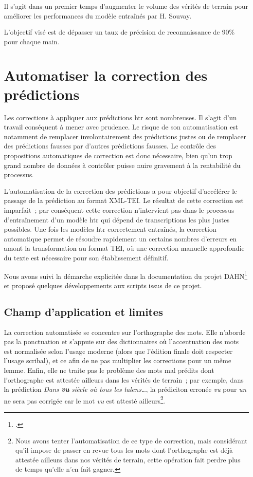\documentclass[a4paper,12pt,twoside]{book}
\begin{document}
			Il s'agit dans un premier temps d'augmenter le volume des vérités de terrain pour améliorer les performances du modèle entraînés par H. Souvay.
			
			L'objectif visé est de dépasser un taux de précision de reconnaissance de 90\% pour chaque main.
	
		\section{Automatiser la correction des prédictions}
			Les corrections à appliquer aux prédictions \gls{htr} sont nombreuses. Il s'agit d'un travail conséquent à mener avec prudence. Le risque de son automatisation est notamment de remplacer involontairement des prédictions justes ou de remplacer des prédictions fausses par d'autres prédictions fausses. Le contrôle des propositions automatiques de correction est donc nécessaire, bien qu'un trop grand nombre de données à contrôler puisse nuire gravement à la rentabilité du processus.
			
			L'automatisation de la correction des prédictions a pour objectif d'accélérer le passage de la prédiction au format XML-TEI. Le résultat de cette correction est imparfait~; par conséquent cette correction n'intervient pas dans le processus d'entraînement d'un modèle \gls{htr} qui dépend de transcriptions les plus justes possibles. Une fois les modèles \gls{htr} correctement entraînés, la correction automatique permet de résoudre rapidement un certains nombres d'erreurs en amont la transformation au format TEI, où une correction manuelle approfondie du texte est nécessaire pour son établissement définitif.
			
			Nous avons suivi la démarche explicitée dans la documentation du projet DAHN\footcite{chiffoleauHowPostOCRCorrection2022} et proposé quelques développements aux scripts issus de ce projet.
			
			\subsection{Champ d'application et limites}	
				La correction automatisée se concentre sur l'orthographe des mots. Elle n'aborde pas la ponctuation et s'appuie sur des dictionnaires où l'accentuation des mots est normalisée selon l'usage moderne (alors que l'édition finale doit respecter l'usage scribal), et ce afin de ne pas multiplier les corrections pour un même lemme. Enfin, elle ne traite pas le problème des mots mal prédits dont l'orthographe est attestée ailleurs dans les vérités de terrain~; par exemple, dans la prédiction \textit{Dans \textbf{vu} siècle où tous les talens…}, la prédiciton erronée \textit{vu} pour \textit{un} ne sera pas corrigée car le mot \textit{vu} est attesté ailleurs\footnote{Nous avons tenter l'automatisation de ce type de correction, mais considérant qu'il impose de passer en revue tous les mots dont l'orthographe est déjà attestée ailleurs dans nos vérités de terrain, cette opération fait perdre plus de temps qu'elle n'en fait gagner.}.
					
\end{document}
